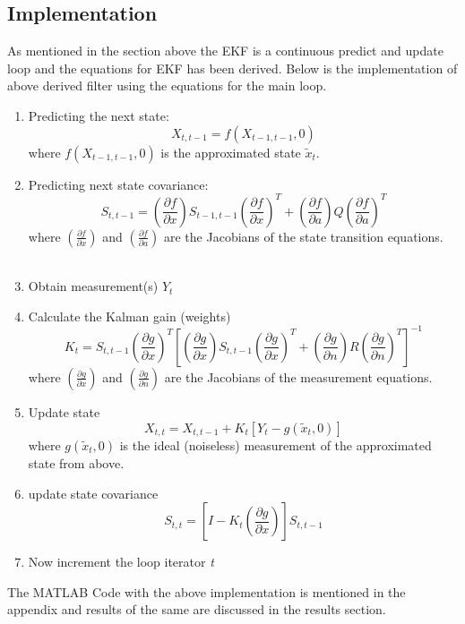 \documentclass[12pt]{article}
\begin{document}
\subsection{Implementation}
As mentioned in the section above the EKF is a continuous predict and update loop and the equations for EKF has been derived. Below is the implementation of above derived filter using the equations for the main loop.  \\
\begin{enumerate}
\item Predicting the next state: 
\begin{equation}
X_{t,t-1} = f(X_{t-1,t-1},0)
\label{eq:Xnext}
\end{equation}
where $f(X_{t-1,t-1},0)$ is the approximated state $\tilde{x}_t$. \\
\item Predicting next state covariance: 
\begin{equation}
S_{t,t-1} =
\left( \frac{\partial f}{\partial x} \right)
S_{t-1,t-1} \left(\frac{\partial f}{\partial x}\right)^T
+ \left( \frac{\partial f}{\partial a} \right) Q
\left(\frac{\partial f}{\partial a}\right)^T
\end{equation}
where $\left(\frac{\partial f}{\partial x}\right)$ and $\left(\frac{\partial f}{\partial a}\right)$ are the Jacobians of the state transition equations. \\
\\
\item Obtain measurement(s) $Y_t$ \\
\item Calculate the Kalman gain (weights)
\begin{equation}
K_t = S_{t,t-1} 
\left( \frac{\partial g}{\partial x} \right)^T
\left[
\left( \frac{\partial g}{\partial x} \right)
S_{t,t-1}
\left( \frac{\partial g}{\partial x} \right)^T
+
\left( \frac{\partial g}{\partial n} \right)
R
\left( \frac{\partial g}{\partial n} \right)^T
\right]^{-1}
\end{equation}
where $\left(\frac{\partial g}{\partial x}\right)$ and $\left(\frac{\partial g}{\partial n}\right)$ are the Jacobians of the measurement equations.

\item Update state
\begin{equation}
X_{t,t} = X_{t,t-1} + K_t [Y_t - g(\tilde{x}_t,0)]
\end{equation}
where $g(\tilde{x}_t,0)$ is the ideal (noiseless) measurement of the approximated state from above.

\item update state covariance
\begin{equation}
S_{t,t} = \left[ I - K_t
\left( \frac{\partial g}{\partial x} \right) \right] S_{t,t-1}
\end{equation}

\item Now increment the loop iterator \textit{t}

\end{enumerate}
The MATLAB Code with the above implementation is mentioned in the appendix and results of the same are discussed in the results section.
\end{document}
